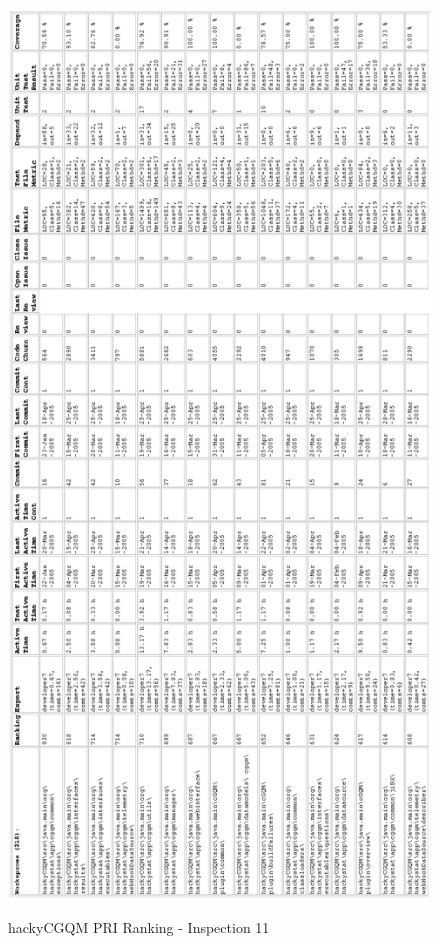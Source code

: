 \begin{figure}[!h]
  \centering
  \caption{hackyCGQM PRI Ranking - Inspection 11}
  \includegraphics[totalheight=1.0\textheight]{figs/Results/11_2005-04-25-hackyCGQM-printable.eps}
  \label{fig:inspection11-hackyCGQM-ranking}
\end{figure}

